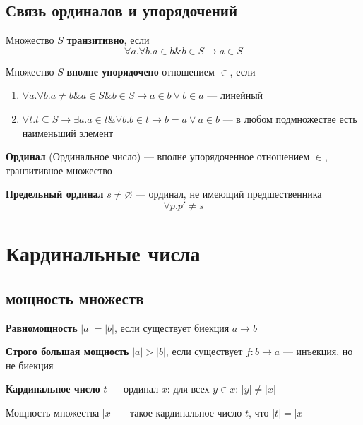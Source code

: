 \documentclass[english]{article}
\begin{document}
\subsection{Связь ординалов и упорядочений}
\label{sec:orgb9c4321}
\begin{definition}
	Множество \(S\) \textbf{транзитивно}, если
	\[ \forall a. \forall b. a \in b \& b \in S \to a \in S \]
	\label{orgec6ba28}
\end{definition}
\begin{definition}
	Множество \(S\) \textbf{вполне упорядочено} отношением \(\in\), если
	\begin{enumerate}
		\item \(\forall a. \forall b. a\neq b\& a \in S \& b \in S \to a \in b \vee b \in a\) --- линейный
		\item \(\forall t. t \subseteq S \to \exists a. a\in t \&\forall b. b \in t \to b = a \vee a \in b\) --- в любом подмножестве есть наименьший элемент
	\end{enumerate}
	\label{org207f341}
\end{definition}
\begin{definition}
	\textbf{Ординал} (Ординальное число) --- вполне упорядоченное отношением \(\in\), транзитивное множество
	\label{org11ed225}
\end{definition}
\begin{definition}
	\textbf{Предельный ординал} \(s \neq \varnothing\) --- ординал, не имеющий предшественника
	\[ \forall p. p' \neq s \]
	\label{org08026de}
\end{definition}
\section{Кардинальные числа}
\label{sec:orgcca49a4}
\subsection{мощность множеств}
\label{sec:org507583e}
\begin{definition}
	\textbf{Равномощность} \(|a| = |b|\), если существует биекция \(a \to b\)
	\label{org8923d9f}
\end{definition}
\begin{definition}
	\textbf{Строго большая мощность} \(|a| > |b|\), если существует \(f: b \to a\) --- инъекция, но не биекция
	\label{org86131c9}
\end{definition}
\begin{definition}
	\textbf{Кардинальное число} \(t\) --- ординал \(x\): для всех \(y \in x\): \(|y| \neq |x|\)
	\label{orgf3f6a83}
\end{definition}
\begin{definition}
	Мощность множества \(|x|\) --- такое кардинальное число \(t\), что \(|t| = |x|\)
	\label{orga9ad016}
\end{definition}
\end{document}
